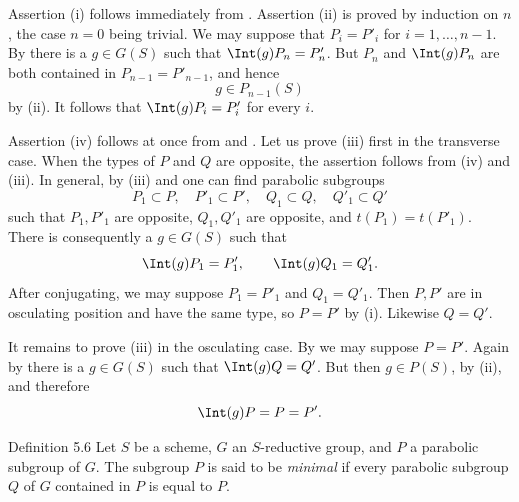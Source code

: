 \SGAProof
Assertion \textup{(i)} follows immediately from .  Assertion
\textup{(ii)} is proved by induction on \(n\), the case \(n=0\)
being trivial.  We may suppose that \(P_i=P'_i\) for
\(i=1,\ldots,n-1\).  By  there is a \(g\in G(S)\) such that
\(\Int(g)P_n=P'_n\).  But \(P_n\) and \(\Int(g)P_n\) are both
contained in \(P_{n-1}=P'_{n-1}\), and hence
\[
 g\in P_{n-1}(S)
\]
by \textup{(ii)}.  It follows that
\(\Int(g)P_i=P'_i\) for every \(i\).

Assertion \textup{(iv)} follows at once from  and .  Let us
prove \textup{(iii)} first in the transverse case.  When the types of
\(P\) and \(Q\) are opposite, the assertion follows from
\textup{(iv)} and \textup{(iii)}.  In general, by
\textup{(iii)} and  one can find parabolic subgroups
\[
 P_1\subset P,\quad P'_1\subset P',\quad
 Q_1\subset Q,\quad Q'_1\subset Q'
\]
such that \(P_1,P'_1\) are opposite, \(Q_1,Q'_1\) are opposite, and
\(t(P_1)=t(P'_1)\).  There is consequently a \(g\in G(S)\) such that
\[
 \Int(g)P_1=P'_1,\qquad\Int(g)Q_1=Q'_1.
\]
After conjugating, we may suppose \(P_1=P'_1\) and \(Q_1=Q'_1\).
Then \(P,P'\) are in osculating position and have the same type, so
\(P=P'\) by \textup{(i)}.  Likewise \(Q=Q'\).

It remains to prove \textup{(iii)} in the osculating case.  By 
we may suppose \(P=P'\).  Again by  there is a \(g\in G(S)\) such
that \(\Int(g)Q=Q'\).  But then \(g\in P(S)\), by
\textup{(ii)}, and therefore
\[
 \Int(g)P=P=P'.
\]
\SGAQED


\begin{sgastatement}{Definition 5.6}
Let \(S\) be a scheme, \(G\) an \(S\)-reductive group, and \(P\) a
parabolic subgroup of \(G\).  The subgroup \(P\) is said to be
\emph{minimal} if every parabolic subgroup \(Q\) of \(G\) contained
in \(P\) is equal to \(P\).
\end{sgastatement}

